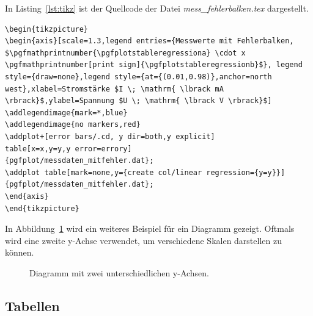In Listing~\ref{lst:tikz} ist der Quellcode der Datei \textit{mess\_fehlerbalken.tex} dargestellt.

\begin{minipage}{\linewidth}
\begin{lstlisting}[caption=Quellcode der Datei \textit{mess\_fehlerbalken.tex}.,label=lst:tikz]
\begin{tikzpicture}
\begin{axis}[scale=1.3,legend entries={Messwerte mit Fehlerbalken,
$\pgfmathprintnumber{\pgfplotstableregressiona} \cdot x  
\pgfmathprintnumber[print sign]{\pgfplotstableregressionb}$}, legend style={draw=none},legend style={at={(0.01,0.98)},anchor=north west},xlabel=Stromstärke $I \; \mathrm{ \lbrack mA \rbrack}$,ylabel=Spannung $U \; \mathrm{ \lbrack V \rbrack}$]
\addlegendimage{mark=*,blue}
\addlegendimage{no markers,red}
\addplot+[error bars/.cd, y dir=both,y explicit]
table[x=x,y=y,y error=errory] 
{pgfplot/messdaten_mitfehler.dat};
\addplot table[mark=none,y={create col/linear regression={y=y}}]
{pgfplot/messdaten_mitfehler.dat};
\end{axis}
\end{tikzpicture}
\end{lstlisting}
\end{minipage}

\clearpage

In Abbildung~\ref{fig:pgfplot2y} wird ein weiteres Beispiel für ein Diagramm gezeigt. Oftmals wird eine zweite y-Achse verwendet, um verschiedene Skalen darstellen zu können.

\begin{figure}[hbt]
	\centering
	
	\caption[Diagramm mit zwei unterschiedlichen y-Achsen.]{Diagramm mit zwei unterschiedlichen y-Achsen.}
	\label{fig:pgfplot2y}
\end{figure}

\clearpage

\subsection{Tabellen}

